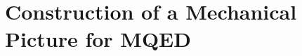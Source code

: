\documentclass{article}
\begin{document}



















\section{Construction of a Mechanical Picture for MQED}
\end{document}
